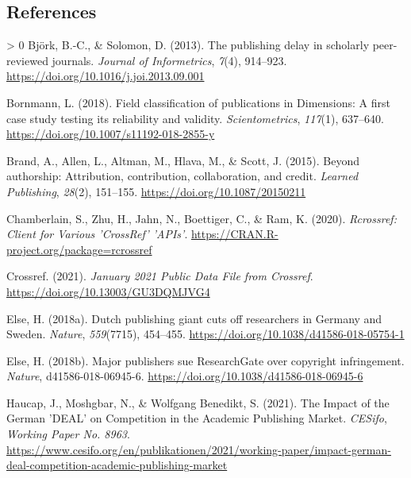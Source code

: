 \documentclass[
]{article}
\newlength{\cslhangindent}
\newenvironment{CSLReferences}[3] %
 {%
  \setlength{\parindent}{0pt}
  \ifodd #1 \everypar{\setlength{\hangindent}{\cslhangindent}}\ignorespaces\fi
  \ifnum #2 > 0
  \setlength{\parskip}{#3\baselineskip}
  \fi
 }%
 {}
\begin{document}
\hypertarget{references}{%
\subsection{References}\label{references}}

\hypertarget{refs}{}
\begin{CSLReferences}{1}{0}
\leavevmode\hypertarget{ref-bjork_publishing_2013}{}%
Björk, B.-C., \& Solomon, D. (2013). The publishing delay in scholarly peer-reviewed journals. \emph{Journal of Informetrics}, \emph{7}(4), 914--923. \url{https://doi.org/10.1016/j.joi.2013.09.001}

\leavevmode\hypertarget{ref-bornmann_field_2018}{}%
Bornmann, L. (2018). Field classification of publications in {Dimensions}: A first case study testing its reliability and validity. \emph{Scientometrics}, \emph{117}(1), 637--640. \url{https://doi.org/10.1007/s11192-018-2855-y}

\leavevmode\hypertarget{ref-brand_beyond_2015}{}%
Brand, A., Allen, L., Altman, M., Hlava, M., \& Scott, J. (2015). Beyond authorship: Attribution, contribution, collaboration, and credit. \emph{Learned Publishing}, \emph{28}(2), 151--155. \url{https://doi.org/10.1087/20150211}

\leavevmode\hypertarget{ref-chamberlain_rcrossref_2020}{}%
Chamberlain, S., Zhu, H., Jahn, N., Boettiger, C., \& Ram, K. (2020). \emph{Rcrossref: {Client} for {Various} '{CrossRef}' '{APIs}'}. \url{https://CRAN.R-project.org/package=rcrossref}

\leavevmode\hypertarget{ref-crossref_january_2021}{}%
Crossref. (2021). \emph{January 2021 {Public} {Data} {File} from {Crossref}}. \url{https://doi.org/10.13003/GU3DQMJVG4}

\leavevmode\hypertarget{ref-else_dutch_2018}{}%
Else, H. (2018a). Dutch publishing giant cuts off researchers in {Germany} and {Sweden}. \emph{Nature}, \emph{559}(7715), 454--455. \url{https://doi.org/10.1038/d41586-018-05754-1}

\leavevmode\hypertarget{ref-else_major_2018}{}%
Else, H. (2018b). Major publishers sue {ResearchGate} over copyright infringement. \emph{Nature}, d41586-018-06945-6. \url{https://doi.org/10.1038/d41586-018-06945-6}

\leavevmode\hypertarget{ref-haucap_impact_2021}{}%
Haucap, J., Moshgbar, N., \& Wolfgang Benedikt, S. (2021). The {Impact} of the {German} '{DEAL}' on {Competition} in the {Academic} {Publishing} {Market}. \emph{CESifo}, \emph{Working Paper No. 8963}. \url{https://www.cesifo.org/en/publikationen/2021/working-paper/impact-german-deal-competition-academic-publishing-market}


\end{CSLReferences}
\end{document}

